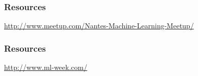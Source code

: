 \begin{frame}
  
\end{frame}

\begin{frame}
  
\end{frame}

\begin{frame}
  
\end{frame}


\begin{frame}
  \frametitle{Resources}

  \vspace{5mm}
  \centerline{\url{http://www.meetup.com/Nantes-Machine-Learning-Meetup/}}
\end{frame}

\begin{frame}
  \frametitle{Resources}

  \vspace{5mm}
  \centerline{\url{http://www.ml-week.com/}}
\end{frame}

\begin{frame}
\end{frame}


